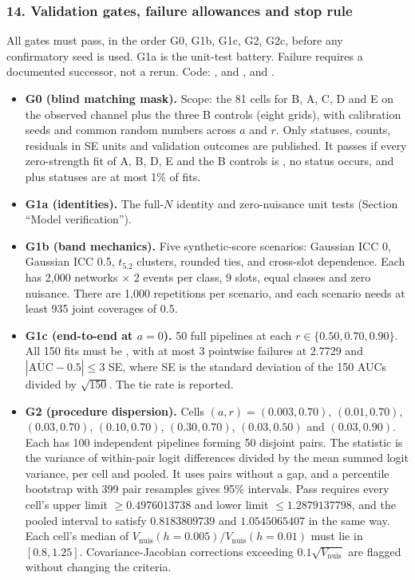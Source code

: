 \subsubsection*{14. Validation gates, failure allowances and stop rule}
All gates must pass, in the order G0, G1b, G1c, G2, G2c, before any confirmatory seed is used. G1a is the unit-test battery. Failure requires a documented successor, not a rerun. Code: ,  and , and .
\begin{itemize}
\item \textbf{G0 (blind matching mask).} Scope: the 81 cells for B, A, C, D and E on the observed channel plus the three B controls (eight grids), with calibration seeds and common random numbers across $a$ and $r$. Only statuses, counts, residuals in SE units and validation outcomes are published. It passes if every zero-strength fit of A, B, D, E and the B controls is , no  status occurs, and  plus  statuses are at most 1\% of fits.
\item \textbf{G1a (identities).} The full-$N$ identity and zero-nuisance unit tests (Section ``Model verification'').
\item \textbf{G1b (band mechanics).} Five synthetic-score scenarios: Gaussian ICC 0, Gaussian ICC 0.5, $t_{5.2}$ clusters, rounded ties, and cross-slot dependence. Each has 2,000 networks $\times$ 2 events per class, 9 slots, equal classes and zero nuisance. There are 1,000 repetitions per scenario, and each scenario needs at least 935 joint coverages of 0.5.
\item \textbf{G1c (end-to-end at $a=0$).} 50 full pipelines at each $r\in\{0.50,0.70,0.90\}$. All 150 fits must be , with at most 3 pointwise failures at 2.7729 and $|\overline{\mathrm{AUC}}-0.5|\le3$ SE, where SE is the standard deviation of the 150 AUCs divided by $\sqrt{150}$. The tie rate is reported.
\item \textbf{G2 (procedure dispersion).} Cells $(a,r)=(0.003,0.70)$, $(0.01,0.70)$, $(0.03,0.70)$, $(0.10,0.70)$, $(0.30,0.70)$, $(0.03,0.50)$ and $(0.03,0.90)$. Each has 100 independent pipelines forming 50 disjoint pairs. The statistic is the variance of within-pair logit differences divided by the mean summed logit variance, per cell and pooled. It uses pairs without a gap, and a percentile bootstrap with 399 pair resamples gives 95\% intervals. Pass requires every cell's upper limit $\ge0.4976013738$ and lower limit $\le1.2879137798$, and the pooled interval to satisfy $0.8183809739$ and $1.0545065407$ in the same way. Each cell's median of $V_{\mathrm{nuis}}(h{=}0.005)/V_{\mathrm{nuis}}(h{=}0.01)$ must lie in $[0.8,1.25]$. Covariance-Jacobian corrections exceeding $0.1\sqrt{V_{\mathrm{nuis}}}$ are flagged without changing the criteria.

\end{itemize}
